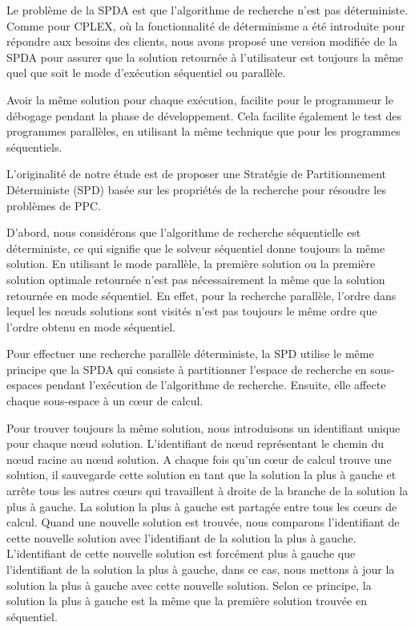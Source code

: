 \documentclass[parallelisme]{compas2014}
\begin{document}
Le problème de la SPDA est que l'algorithme de recherche n'est pas déterministe.
Comme pour CPLEX, où la fonctionnalité de déterminisme a été introduite pour répondre aux besoins des clients, nous avons proposé une version modifiée de la SPDA pour assurer que la solution retournée à l'utilisateur est toujours la même quel que soit le mode d'exécution séquentiel ou parallèle.

Avoir la même solution pour chaque exécution, facilite pour le programmeur le débogage pendant la phase de développement. Cela facilite également le test des programmes parallèles, en utilisant la même technique que pour les programmes séquentiels.

L'originalité de notre étude est de proposer une Stratégie de Partitionnement Déterministe (SPD) basée sur les propriétés de la recherche pour résoudre les problèmes de PPC.

D'abord, nous considérons que l'algorithme de recherche séquentielle est déterministe, ce qui signifie que le solveur séquentiel donne toujours la même solution. En utilisant le mode parallèle, la première solution ou la première solution optimale retournée n'est pas nécessairement la même que la solution retournée en mode séquentiel. En effet, pour la recherche parallèle, l'ordre dans lequel les nœuds solutions sont visités n'est pas toujours le même ordre que l'ordre obtenu en mode séquentiel.

Pour effectuer une recherche parallèle déterministe, la SPD utilise le même principe que la SPDA qui consiste à partitionner l'espace de recherche en sous-espaces pendant l'exécution de l'algorithme de recherche. Ensuite, elle affecte chaque sous-espace à un cœur de calcul.

Pour trouver toujours la même solution, nous introduisons un identifiant unique pour chaque nœud solution. L'identifiant de nœud représentant le chemin du nœud racine au nœud solution.
A chaque fois qu'un cœur de calcul trouve une solution, il sauvegarde cette solution en tant que la solution la plus à gauche et arrête tous les autres cœurs qui travaillent à droite de la branche de la solution la plus à gauche. La solution la plus à gauche est partagée entre tous les cœurs de calcul. Quand une nouvelle solution est trouvée, nous comparons l'identifiant de cette nouvelle solution avec l'identifiant de la solution la plus à gauche. L'identifiant de cette nouvelle solution est forcément plus à gauche que l'identifiant de la solution la plus à gauche, dans ce cas, nous mettons à jour la solution la plus à gauche avec cette nouvelle solution. Selon ce principe, la solution la plus à gauche est la même que la première solution trouvée en séquentiel.
\end{document}
